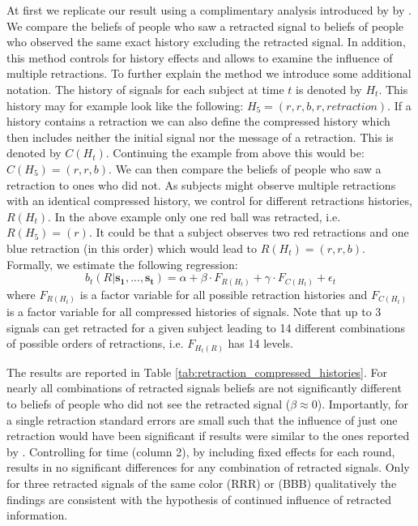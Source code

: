 \documentclass{article}
\begin{document}
At first we replicate our result using a complimentary analysis introduced by by \cite{Goncalves2022}. We compare the beliefs of people who saw a retracted signal to beliefs of people who observed the same exact history excluding the retracted signal. In addition, this method controls for history effects and allows to examine the influence of multiple retractions. To further explain the method we introduce some additional notation. The history of signals for each subject at time $t$ is denoted by $H_t$. This history may for example look like the following: $H_5=(r,r,b,r,retraction)$. If a history contains a retraction we can also define the compressed history which then includes neither the initial signal nor the message of a retraction. This is denoted by $C(H_t)$. Continuing the example from above this would be: $C(H_5)=(r,r,b)$. We can then compare the beliefs of people who saw a retraction to ones who did not. As subjects might observe multiple retractions with an identical compressed history, we control for different retractions histories, $R(H_t)$. In the above example only one red ball was retracted, i.e. $R(H_5)=(r)$. It could be that a subject observes two red retractions and one blue retraction (in this order) which would lead to $R(H_t)=(r,r,b)$. Formally, we estimate the following regression: 
\begin{equation}
    b_t(R|\mathbf{s_1},...,\mathbf{s_t})=\alpha + \beta \cdot F_{R(H_t)} + \gamma \cdot F_{C(H_t)} + \epsilon_t
\end{equation}
where $F_{R(H_t)}$ is a factor variable for all possible retraction histories and $F_{C(H_t)}$ is a factor variable for all compressed histories of signals. Note that up to 3 signals can get retracted for a given subject leading to 14 different combinations of possible orders of retractions, i.e. $F_{H_t(R)}$ has 14 levels.

The results are reported in Table \ref{tab:retraction_compressed_histories}. For nearly all combinations of retracted signals beliefs are not significantly different to beliefs of people who did not see the retracted signal ($\beta\approx0$). Importantly, for a single retraction standard errors are small such that the influence of just one retraction would have been significant if results were similar to the ones reported by \cite{Goncalves2022}. Controlling for time (column 2), by including fixed effects for each round, results in no significant differences for any combination of retracted signals. Only for three retracted signals of the same color (RRR) or (BBB) qualitatively the findings are consistent with the hypothesis of continued influence of retracted information. 
\end{document}
